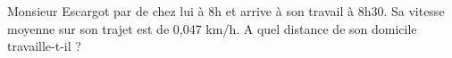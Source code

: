 
Monsieur Escargot par de chez lui à 8h et arrive à son travail à 8h30. Sa vitesse moyenne sur son trajet est de 0,047 km/h. A quel distance de son domicile travaille-t-il ?